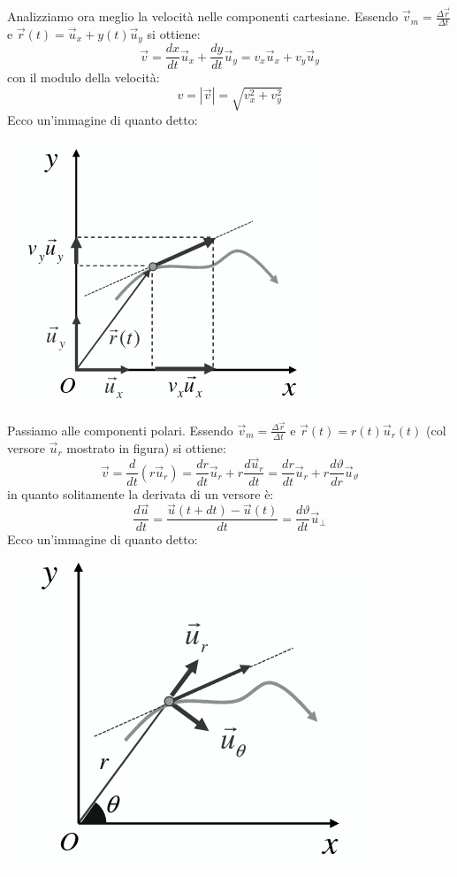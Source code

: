 \documentclass[a4paper,12pt, oneside]{book}
\begin{document}
Analizziamo ora meglio la velocità nelle componenti cartesiane. Essendo $\vec{v}_m=\frac{\Delta\vec{r}}{\Delta t}$ e $\vec{r}(t)=\vec{u}_x+y(t)\vec{u}_y$ si ottiene:
$$\vec{v}=\frac{dx}{dt}\vec{u}_x+\frac{dy}{dt}\vec{u}_y=v_x\vec{u}_x+v_y\vec{u}_y$$
con il modulo della velocità:
$$v=|\vec{v}|=\sqrt{v_x^2+v_y^2}$$
Ecco un'immagine di quanto detto:
\begin{center}
\includegraphics[scale=0.6]{img/pia5.png}
\end{center}
Passiamo alle componenti polari. Essendo $\vec{v}_m=\frac{\Delta\vec{r}}{\Delta t}$ e $\vec{r}(t)=r(t)\vec{u}_r(t)$ (col versore $\vec{u}_r$ mostrato in figura) si ottiene:
$$\vec{v}=\frac{d}{dt}(r\vec{u}_r)=\frac{dr}{dt}\vec{u}_r+r\frac{d\vec{u}_r}{dt}=\frac{dr}{dt} \vec{u}_r+r\frac{d\vartheta}{dr}\vec{u}_\vartheta$$
in quanto solitamente la derivata di un versore è: 
$$\frac{d\vec{u}}{dt}=\frac{\vec{u}(t+dt)-\vec{u}(t)}{dt}=\frac{d\vartheta}{dt}\vec{u}_\bot$$
Ecco un'immagine di quanto detto:
\begin{center}
\includegraphics[scale=0.5]{img/pia6.png}
\end{center}
\end{document}
